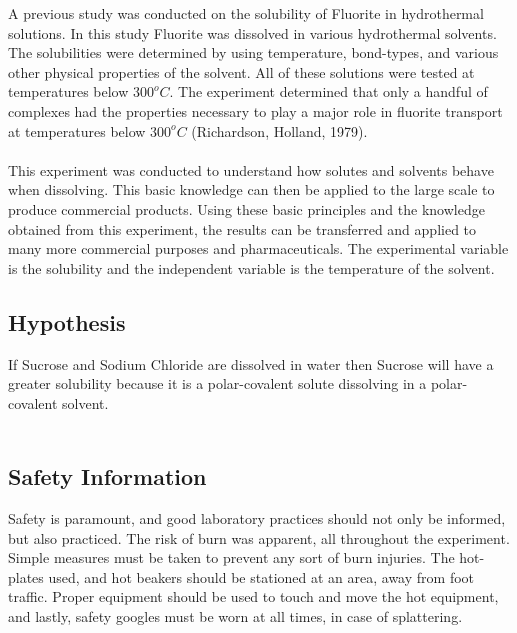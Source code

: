 \documentclass{article}
\begin{document}
A previous study was conducted on the solubility of Fluorite in hydrothermal solutions. In this study Fluorite was dissolved in various hydrothermal solvents. The solubilities were determined by using temperature, bond-types, and various other physical properties of the solvent. All of these solutions were tested at temperatures below $300^o C$. The experiment determined that only a handful of complexes had the properties necessary to play a major role in fluorite transport at temperatures below $300^o C$ (Richardson, Holland, 1979).\\\\
This experiment was conducted to understand how solutes and solvents behave when dissolving. This basic knowledge can then be applied to the large scale to produce commercial products. Using these basic principles and the knowledge obtained from this experiment, the results can be transferred and applied to many more commercial purposes and pharmaceuticals. The experimental variable is the solubility and the independent variable is the temperature of the solvent.  
\subsection*{Hypothesis} %
If Sucrose and Sodium Chloride are dissolved in water then Sucrose will have a greater solubility because it is a polar-covalent solute dissolving in a polar-covalent solvent. \\\\
\subsection*{Safety Information} %
Safety is paramount, and good laboratory practices should not only be informed, but also practiced. The risk of burn was apparent, all throughout the experiment. Simple measures must be taken to prevent any sort of burn injuries. The hot-plates used, and hot beakers should be stationed at an area, away from foot traffic. Proper equipment should be used to touch and move the hot equipment, and lastly, safety googles must be worn at all times, in case of splattering. 
\end{document}
